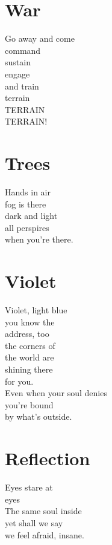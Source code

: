 \documentclass[a4paper,twoside, openany]{book}
\newenvironment{Verse}
  {\center\varwidth{\linewidth}\fontsize{18}{21.6}\selectfont}
  {\endvarwidth\endcenter}
\begin{document}
\chapter{War}
\begin{Verse}
    Go away and come\\
    command\\
    sustain\\
    engage\\
    and train\\
    terrain\\
    TERRAIN\\
    TERRAIN!
\end{Verse}

\chapter{Trees}
\begin{Verse}
    Hands in air\\
    fog is there\\
    dark and light\\
    all perspires\\
    when you're there.
\end{Verse}

\chapter{Violet}
\begin{Verse}
    Violet, light blue\\
    you know the\\
    address, too\\
    the corners of\\
    the world are\\
    shining there\\
    for you.\\
    Even when your soul denies\\
    you're bound\\
    by what's outside.
\end{Verse}


\chapter{Reflection}
\begin{Verse}
    Eyes stare at\\
    eyes\\
    The same soul inside\\
    yet shall we say\\
    we feel afraid, insane.
\end{Verse}
\end{document}
